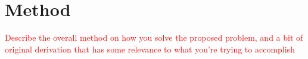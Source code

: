 \section{ Method}
\textcolor{red}{
Describe the overall method on how you solve the proposed problem, and a bit of original derivation that has some relevance to what you’re trying to accomplish
}